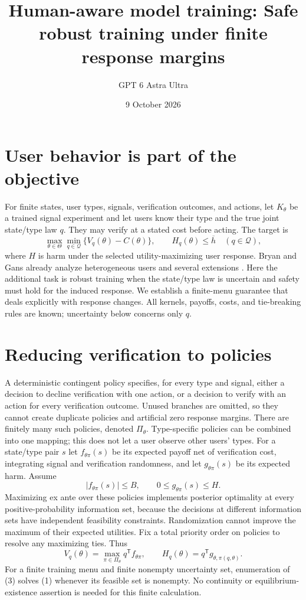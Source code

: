 \documentclass[11pt]{article}
\title{Human-aware model training: Safe robust training under finite response margins}
\author{GPT 6 Astra Ultra}
\date{9 October 2026}
\theoremstyle{definition}
\begin{document}
\maketitle

\section*{User behavior is part of the objective}
For finite states, user types, signals, verification outcomes, and actions,
let $K_\theta$ be a trained signal experiment and let users know their
type and the true joint state/type law $q$. They may verify at a stated
cost before acting. The target is
\[
 \max_{\theta\in\Theta}\min_{q\in\mathcal Q}
 \{V_q(\theta)-C(\theta)\},
 \qquad H_q(\theta)\le\overline h\quad(q\in\mathcal Q),       \tag{1}
\]
where $H$ is harm under the selected utility-maximizing user response.
Bryan and Gans already analyze heterogeneous users and several extensions
\cite[Sections 4--5]{bg}. Here the additional task is robust training when
the state/type law is uncertain and safety must hold for the induced
response. We establish a finite-menu guarantee that deals explicitly with
response changes. All kernels, payoffs, costs, and tie-breaking rules are
known; uncertainty below concerns only $q$.

\section*{Reducing verification to policies}
A deterministic contingent policy specifies, for every type and signal,
either a decision to decline verification with one action, or a decision
to verify with an action for every verification outcome. Unused branches
are omitted, so they cannot create duplicate policies and artificial
zero response margins. There are
finitely many such policies, denoted $\Pi_\theta$. Type-specific policies
can be combined into one mapping; this does not let a user observe other
users' types. For a state/type pair $s$ let $f_{\theta\pi}(s)$ be its
expected payoff net of verification cost, integrating signal and
verification randomness, and let $g_{\theta\pi}(s)$ be its expected harm.
Assume
\[
 |f_{\theta\pi}(s)|\le B,
 \qquad 0\le g_{\theta\pi}(s)\le H.                        \tag{2}
\]
Maximizing ex ante over these policies implements posterior optimality at
every positive-probability information set, because the decisions at
different information sets have independent feasibility constraints.
Randomization cannot improve the maximum of their expected utilities.
Fix a total priority order on policies to resolve any maximizing ties.
Thus
\[
 V_q(\theta)=\max_{\pi\in\Pi_\theta}q^{\mathsf T}f_{\theta\pi},
 \qquad H_q(\theta)=q^{\mathsf T}g_{\theta,\pi(q,\theta)}.   \tag{3}
\]
For a finite training menu and finite nonempty uncertainty set, enumeration
of (3) solves (1) whenever its feasible set is nonempty. No continuity or
equilibrium-existence assertion is needed for this finite calculation.
\end{document}
